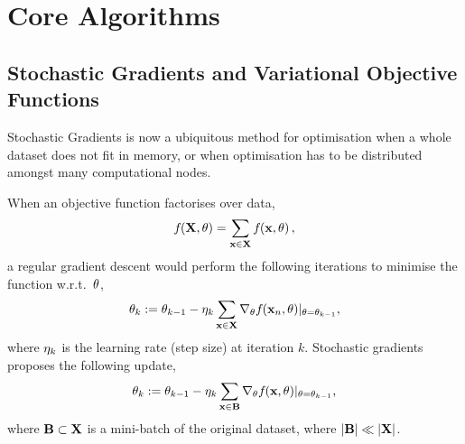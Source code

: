 \documentclass[11pt, oneside]{article}
\title{\sffamily{\emph{revrand}: Technical Report}}
\author{Daniel Steinberg, Louis Tiao \\
    Data61 $|$ CSIRO \\
    email: \texttt{\{firstname.lastname\}@data61.csiro.au}
}
\date{}
\begin{document}
\maketitle
\vspace{-0.5cm}
\noindent\makebox[\linewidth]{\rule{\linewidth}{0.8pt}}
\vspace{0.3cm}

\begin{abstract}
    This is a technical report on the \emph{revrand} software library. This
    library implements various Bayesian linear models (Bayesian linear
    regression), approximate Gaussian processes and generalised linear models.
    These algorithms have been implemented such that they can be used for
    large-scale inference by using stochastic gradients. All of the algorithms
    in \emph{revrand} use a unified feature composition framework that allows
    for easy concatenation and selective application of regression basis
    functions.
\end{abstract}

\tableofcontents

\section{Core Algorithms}

\subsection{Stochastic Gradients and Variational Objective Functions}
\label{sub:stochvar}

Stochastic Gradients is now a ubiquitous method for optimisation when a whole
dataset does not fit in memory, or when optimisation has to be distributed
amongst many computational nodes.

When an objective function factorises over data,
\begin{equation}
    {f}_{}\!\left({{\mathbf{X}, \theta}}\right) = \sum_{\mathbf{x} \in \mathbf{X}} {f}_{}\!\left({{\mathbf{x}, \theta}}\right),
\end{equation}
a regular gradient descent would perform the following iterations to minimise
the function w.r.t.\ $\theta$,
\begin{equation}
    \theta_k := \theta_{k-1} - \eta_k \sum_{\mathbf{x} \in \mathbf{X}}
    \nabla_{\theta} {f}_{}\!\left({{\mathbf{x}_n, \theta}}\right)\!|_{\theta = \theta_{k-1}},
\end{equation}
where $\eta_k$ is the learning rate (step size) at iteration $k$. Stochastic
gradients proposes the following update,
\begin{equation}
    \theta_k := \theta_{k-1} - \eta_k \sum_{\mathbf{x} \in \mathbf{B}}
    \nabla_{\theta} {f}_{}\!\left({{\mathbf{x}, \theta}}\right)\!|_{\theta = \theta_{k-1}},
    \label{eq:sg}
\end{equation}
where $\mathbf{B} \subset \mathbf{X}$ is a mini-batch of the original dataset, where
$|\mathbf{B}| \ll |\mathbf{X}|$.
\end{document}

